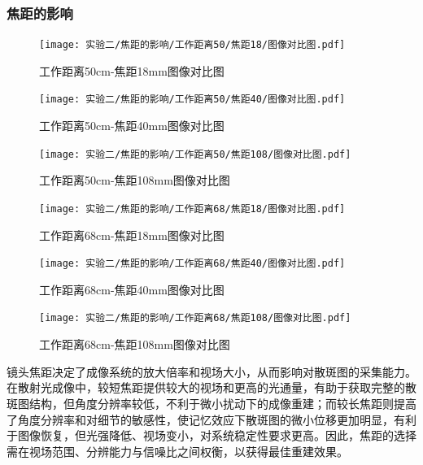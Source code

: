 \subsubsection{焦距的影响}
  \begin{figure}[H]
      \centering
      \texttt{[image: 实验二/焦距的影响/工作距离50/焦距18/图像对比图.pdf]}
      \caption{工作距离50cm-焦距18mm图像对比图}
  \end{figure}

  \begin{figure}[H]
      \centering
      \texttt{[image: 实验二/焦距的影响/工作距离50/焦距40/图像对比图.pdf]}
      \caption{工作距离50cm-焦距40mm图像对比图}
  \end{figure}

  \begin{figure}[H]
      \centering
      \texttt{[image: 实验二/焦距的影响/工作距离50/焦距108/图像对比图.pdf]}
      \caption{工作距离50cm-焦距108mm图像对比图}
  \end{figure}

  \begin{figure}[H]
      \centering
      \texttt{[image: 实验二/焦距的影响/工作距离68/焦距18/图像对比图.pdf]}
      \caption{工作距离68cm-焦距18mm图像对比图}
  \end{figure}

  \begin{figure}[H]
      \centering
      \texttt{[image: 实验二/焦距的影响/工作距离68/焦距40/图像对比图.pdf]}
      \caption{工作距离68cm-焦距40mm图像对比图}
  \end{figure}

  \begin{figure}[H]
      \centering
      \texttt{[image: 实验二/焦距的影响/工作距离68/焦距108/图像对比图.pdf]}
      \caption{工作距离68cm-焦距108mm图像对比图}
  \end{figure}


  镜头焦距决定了成像系统的放大倍率和视场大小，从而影响对散斑图的采集能力。在散射光成像中，较短焦距提供较大的视场和更高的光通量，有助于获取完整的散斑图结构，但角度分辨率较低，不利于微小扰动下的成像重建；而较长焦距则提高了角度分辨率和对细节的敏感性，使记忆效应下散斑图的微小位移更加明显，有利于图像恢复，但光强降低、视场变小，对系统稳定性要求更高。因此，焦距的选择需在视场范围、分辨能力与信噪比之间权衡，以获得最佳重建效果。

